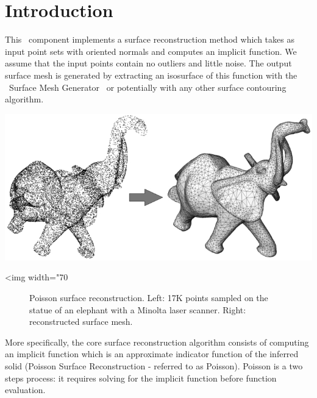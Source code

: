 \section{Introduction}

This \cgal\ component implements a surface reconstruction method which takes as input point sets with oriented normals and computes an implicit function. We assume that the input points contain no outliers and little noise. The output surface mesh is generated by extracting an isosurface of this function with the \cgal\ Surface Mesh Generator~\cite{cgal:ry-gsddrm-06} or potentially with any other surface contouring algorithm.

\begin{center}
    \label{Surface_reconstruction_points_3-fig-introduction}
    \begin{ccTexOnly}
        \includegraphics[width=1.0\textwidth]{Surface_reconstruction_points_3/introduction} %
    \end{ccTexOnly}
    \begin{ccHtmlOnly}
        <img width="70%
    \end{ccHtmlOnly}
    \begin{figure}[h]
        \caption{Poisson surface reconstruction.
                 Left: 17K points sampled on the statue of an
                 elephant with a Minolta laser scanner.
                 Right: reconstructed surface mesh.}
    \end{figure}
\end{center}

More specifically, the core surface reconstruction algorithm consists of computing an implicit function which is an approximate indicator function of the inferred solid (Poisson Surface Reconstruction - referred to as Poisson). Poisson is a two steps process: it requires solving for the implicit function before function evaluation.



